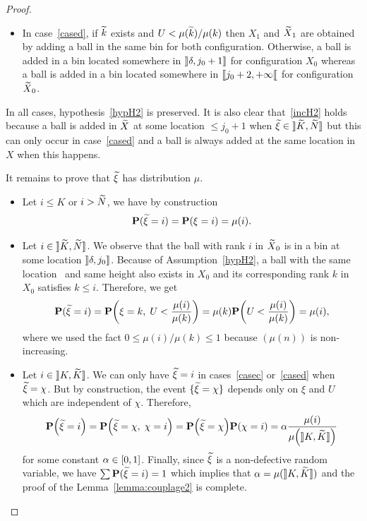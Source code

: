 \documentclass[AHL,Unicode,longabstracts,published]{cedram}
\renewcommand{\P}{\mathbf{P}}
\let\originalleft\left
\let\originalright\right
\renewcommand{\left}{\mathopen{}\mathclose\bgroup\originalleft}
\renewcommand{\right}{\aftergroup\egroup\originalright}
\let\oldin\in
\renewcommand{\in}{\mathchoice{\oldin}{\oldin}{\,\oldin\,}{\,\oldin\,}}
\let\oldtilde\tilde
\renewcommand*{\tilde}[1]{\mathchoice{\widetilde{#1}}{\widetilde{#1}}{\oldtilde{#1}}{\oldtilde{#1}}}
\newcommand{\llbracket}{\mathopen{[\mkern -2.7mu[}}
\newcommand{\rrbracket}{\mathclose{]\mkern -2.7mu]}}
\newcommand{\llbracketclose}{\mathclose{[\mkern -2.7mu[}}
\newcommand{\rrbracketopen}{\mathopen{]\mkern -2.7mu]}}
\newcommand{\llb}{\llbracket}
\newcommand{\rrb}{\rrbracket}
\begin{document}
\begin{proof}
\begin{itemize}
\item In case~\eqref{cased}, if $\tilde{k}$ exists and $U < \mu(\tilde{k}) / \mu(k)$ then $X_1$ and $\tilde{X}_1$ are obtained by adding a ball in the same bin for both configuration. Otherwise, a ball is added in a bin located somewhere in $\rrbracketopen \delta, j_0 + 1\rrb$ for configuration $X_0$ whereas a ball is added in a bin located somewhere in $\llb j_0 + 2, +\infty\llbracketclose$ for configuration~$\tilde{X}_0$.
\end{itemize}
In all cases, hypothesis~\eqref{hypH2} is preserved. It is also clear that~\eqref{incH2} holds because a ball is added in $\tilde{X}$ at some location $\leq j_0 + 1$ when $\tilde{\xi} \in \rrbracketopen\tilde{K}, \tilde{N}\rrb$ but this can only occur in case~\eqref{cased} and a ball is always added at the same location in $X$ when this happens.

It remains to prove that $\tilde{\xi}$ has distribution $\mu$.
\begin{itemize}
\item Let $i \leq K$ or $i > \tilde{N}$, we have by construction
\[
\P(\tilde{\xi} = i) = \P(\xi = i) = \mu(i).
\]
\item Let $i \in \rrbracketopen\tilde{K}, \tilde{N}\rrb$. We observe that the ball with rank $i$ in $\tilde{X}_0$ is in a bin at some location $\rrbracketopen\delta, j_0\rrb $. Because of Assumption~\eqref{hypH2}, a ball with the same location{\pagebreak\linebreak\ }
and same height also exists in $X_0$ and its corresponding rank $k$ in $X_0$ satisfies $k \leq i$. Therefore, we get
\[
\P(\tilde{\xi} = i) = \P\left(\xi = k,\; U < \frac{\mu(i)}{\mu(k)}\right) = \mu(k) \P\left(U < \frac{\mu(i)}{\mu(k)}\right) = \mu(i),
\]
where we used the fact $0 \leq \mu(i) / \mu(k) \leq 1$ because $(\mu(n))$ is non-increasing.
\item Let $i \in \rrbracketopen K, \tilde{K}\rrb$. We can only have $\tilde{\xi} = i$ in cases~\eqref{casec} or~\eqref{cased} when $\tilde{\xi} = \chi$. But by construction, the event $\{\tilde{\xi} = \chi\}$ depends only on $\xi$ and $U$ which are independent of $\chi$. Therefore,
\[
\P\left(\tilde{\xi} = i\right) = \P\left(\tilde{\xi} = \chi,\; \chi = i\right) = \P\left(\tilde{\xi} = \chi\right) \P(\chi = i) = \alpha \frac{\mu(i)}{\mu\left(\rrbracketopen K, \tilde{K}\rrb\right)}
\]
for some constant $\alpha \in [0,1]$. Finally, since $\tilde{\xi}$ is a non-defective random variable, we have $\sum \P(\tilde{\xi} = i) = 1$ which implies that $\alpha = \mu(\rrbracketopen K, \tilde{K}\rrb)$ and the proof of the Lemma~\ref{lemma:couplage2} is complete. \qedhere
\end{itemize}
\end{proof}
\end{document}
